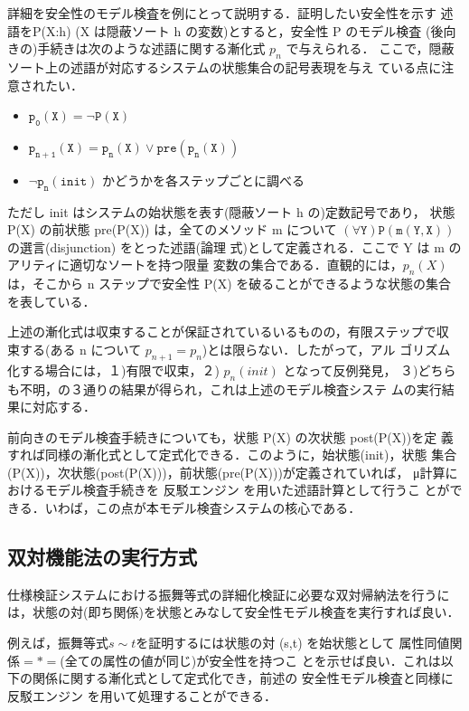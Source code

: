 詳細を安全性のモデル検査を例にとって説明する．証明したい安全性を示す
述語をP(X:h) (X は隠蔽ソート h の変数)とすると，安全性 P のモデル検査
(後向きの)手続きは次のような述語に関する漸化式 $p_n$ で与えられる．
ここで，隠蔽ソート上の述語が対応するシステムの状態集合の記号表現を与え
ている点に注意されたい．

\begin{itemize}
\item $\mathtt{p_0(X)=\neg P(X)}$
\item $\mathtt{p_{n+1}(X)=p_n(X)\vee pre(p_n(X))}$
\item $\mathtt{\neg p_n(init)}$ かどうかを各ステップごとに調べる
\end{itemize}

ただし init はシステムの始状態を表す(隠蔽ソート h の)定数記号であり，
状態 P(X) の前状態 pre(P(X)) は，全てのメソッド m について
$\mathtt{(\forall Y) P(m(Y,X))}$ の選言(disjunction) をとった述語(論理
式)として定義される．ここで Y は m のアリティに適切なソートを持つ限量
変数の集合である．直観的には，$p_n(X)$ は，そこから n ステップで安全性 
P(X) を破ることができるような状態の集合を表している．

上述の漸化式は収束することが保証されているいるものの，有限ステップで収
束する(ある n について $p_{n+1} = p_{n}$)とは限らない．したがって，アル
ゴリズム化する場合には，１)有限で収束，２) $p_n(init)$ となって反例発見，
３)どちらも不明，の３通りの結果が得られ，これは上述のモデル検査システ
ムの実行結果に対応する．

前向きのモデル検査手続きについても，状態 P(X) の次状態 post(P(X))を定
義すれば同様の漸化式として定式化できる．このように，始状態(init)，状態
集合(P(X))，次状態(post(P(X)))，前状態(pre(P(X)))が定義されていれば，
μ計算におけるモデル検査手続きを 反駁エンジン を用いた述語計算として行うこ
とができる．いわば，この点が本モデル検査システムの核心である．

\subsection{双対機能法の実行方式}
\label{sec:how-to-co-induction}

仕様検証システムにおける振舞等式の詳細化検証に必要な双対帰納法を行うに
は，状態の対(即ち関係)を状態とみなして安全性モデル検査を実行すれば良い．

例えば，振舞等式$s\sim t$を証明するには状態の対 (s,t) を始状態として
属性同値関係$\mathtt{{=}{*}{=}}$(全ての属性の値が同じ)が安全性を持つこ
とを示せば良い．これは以下の関係に関する漸化式として定式化でき，前述の
安全性モデル検査と同様に反駁エンジン を用いて処理することができる．

